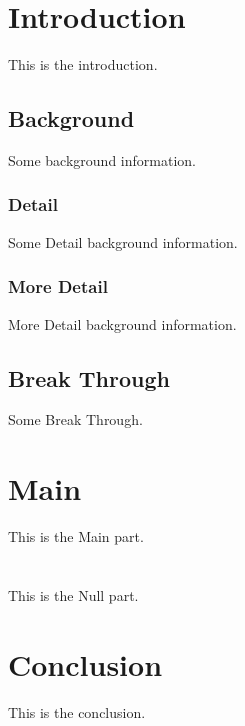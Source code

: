 \documentclass{article}
\begin{document}
\section{Introduction}
This is the introduction.

\subsection{Background}
Some background information.

\subsubsection{Detail}
Some Detail background information.

\subsubsection{More Detail}
More Detail background information.

\subsection{Break Through}
Some Break Through.

\section{Main}
This is the Main part.

\section{}
This is the Null part.

\section{Conclusion}
This is the conclusion.
\end{document}
